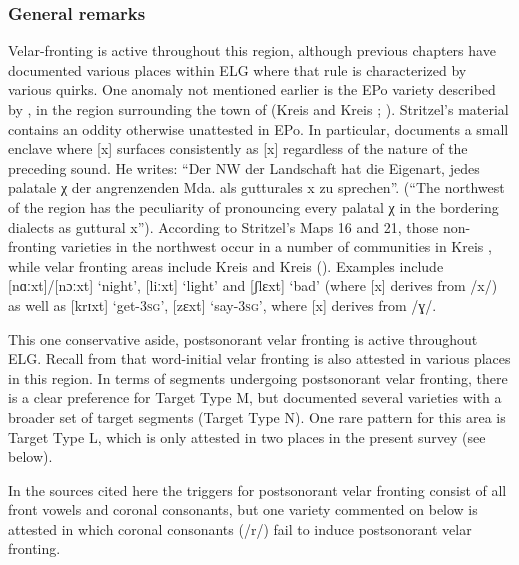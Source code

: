 \subsubsection{General remarks}\largerpage
Velar-fronting is active throughout this region, although previous chapters have documented various places within ELG where that rule is characterized by various quirks. One anomaly not mentioned earlier is the EPo variety described by \citet{Stritzel1937}, in the region surrounding the town of  (Kreis  and Kreis ; ). Stritzel’s material contains an oddity otherwise unattested in EPo. In particular, \citet[55]{Stritzel1937} documents a small enclave where [x] surfaces consistently as [x] regardless of the nature of the preceding sound. He writes: “Der NW der Landschaft hat die Eigenart, jedes palatale χ der angrenzenden Mda. als gutturales x zu sprechen”. (“The northwest of the region has the peculiarity of pronouncing every palatal χ in the bordering dialects as guttural x”). According to Stritzel’s Maps 16 and 21, those non-fronting varieties in the northwest occur in a number of communities in Kreis , while velar fronting areas include Kreis  and Kreis  (). Examples include [nɑːxt]/[nɔːxt] ‘night’, [liːxt] ‘light’ and [ʃlɛxt] ‘bad’ (where [x] derives from /x/) as well as [krɪxt] ‘get\textsc{{}-3sg}’, [zɛxt] ‘say\textsc{{}-3sg}’, where [x] derives from /ɣ/.

\begin{sloppypar}
This one conservative  aside, postsonorant velar fronting is active throughout ELG. Recall from  that word-initial velar fronting is also attested in various places in this region. In terms of segments undergoing postsonorant velar fronting, there is a clear preference for Target Type M, but  documented several varieties with a broader set of target segments (Target Type N). One  rare pattern for this area is Target Type L, which is only attested in two places in the present survey (see below).
\end{sloppypar}

In the sources cited here the triggers for postsonorant velar fronting consist of all front vowels and coronal consonants, but one variety commented on below is attested in which coronal consonants (/r/) fail to induce postsonorant velar fronting.


